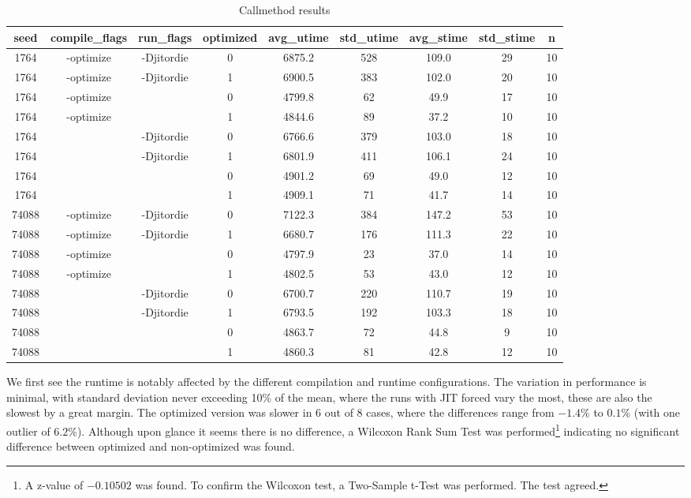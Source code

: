 \documentclass[a4paper,11pt]{scrartcl}
\begin{document}
\begin{table}[h!]
\begin{center}
\begin{tabular}{c|c|c|c|c|c|c|c|c|}
seed & compile\_flags & run\_flags & optimized & avg\_utime & std\_utime & avg\_stime & std\_stime & n \\
\hline
1764 & -optimize & -Djitordie & 0 & 6875.2 & 528 & 109.0 & 29 & 10 \\
1764 & -optimize & -Djitordie & 1 & 6900.5 & 383 & 102.0 & 20 & 10 \\
1764 & -optimize &  & 0 & 4799.8 & 62 & 49.9 & 17 & 10 \\
1764 & -optimize &  & 1 & 4844.6 & 89 & 37.2 & 10 & 10 \\
1764 &  & -Djitordie & 0 & 6766.6 & 379 & 103.0 & 18 & 10 \\
1764 &  & -Djitordie & 1 & 6801.9 & 411 & 106.1 & 24 & 10 \\
1764 &  &  & 0 & 4901.2 & 69 & 49.0 & 12 & 10 \\
1764 &  &  & 1 & 4909.1 & 71 & 41.7 & 14 & 10 \\
74088 & -optimize & -Djitordie & 0 & 7122.3 & 384 & 147.2 & 53 & 10 \\
74088 & -optimize & -Djitordie & 1 & 6680.7 & 176 & 111.3 & 22 & 10 \\
74088 & -optimize &  & 0 & 4797.9 & 23 & 37.0 & 14 & 10 \\
74088 & -optimize &  & 1 & 4802.5 & 53 & 43.0 & 12 & 10 \\
74088 &  & -Djitordie & 0 & 6700.7 & 220 & 110.7 & 19 & 10 \\
74088 &  & -Djitordie & 1 & 6793.5 & 192 & 103.3 & 18 & 10 \\
74088 &  &  & 0 & 4863.7 & 72 & 44.8 & 9 & 10 \\
74088 &  &  & 1 & 4860.3 & 81 & 42.8 & 12 & 10 \\

\end{tabular}
\end{center}
\caption{Callmethod results}
\label{tbl:callmethod-results}
\end{table}

We first see the runtime is notably affected by the different compilation and runtime configurations. The variation in performance is minimal, with standard deviation never exceeding 10\% of the mean, where the runs with JIT forced vary the most, these are also the slowest by a great margin. The optimized version was slower in 6 out of 8 cases, where the differences range from $-1.4$\% to $0.1$\% (with one outlier of $6.2$\%). Although upon glance it seems there is no difference, a Wilcoxon Rank Sum Test was performed\footnote{A z-value of $-0.10502$ was found. To confirm the Wilcoxon test, a Two-Sample t-Test was performed. The test agreed.} indicating no significant difference between optimized and non-optimized was found.
\end{document}
